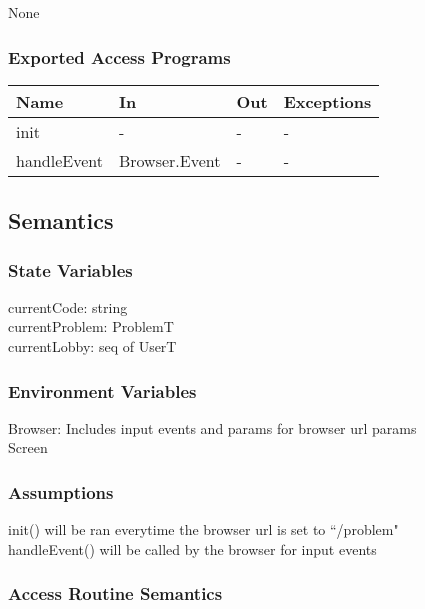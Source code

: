 \documentclass[12pt, titlepage]{article}
\begin{document}
None

\subsubsection{Exported Access Programs}

\begin{center}
\begin{tabular}{p{2cm} p{4cm} p{4cm} p{2cm}}
\hline
\textbf{Name} & \textbf{In} & \textbf{Out} & \textbf{Exceptions} \\
\hline
init & - & - & - \\
handleEvent & Browser.Event & - & -\\
\hline
\end{tabular}
\end{center}

\subsection{Semantics}

\subsubsection{State Variables}

currentCode: string \\
currentProblem: ProblemT \\
currentLobby: seq of UserT

\subsubsection{Environment Variables}

Browser: Includes input events and params for browser url params\\
Screen\\

\subsubsection{Assumptions}

init() will be ran everytime the browser url is set to ``/problem"\\
handleEvent() will be called by the browser for input events

\subsubsection{Access Routine Semantics}
\end{document}
